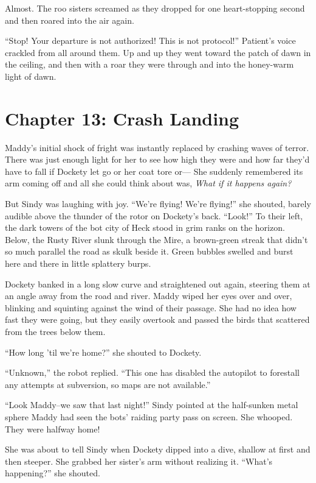 \documentclass[10pt]{article}
\begin{document}
Almost. The roo sisters screamed as they dropped for one heart-stopping
second and then roared into the air again.

``Stop! Your departure is not authorized! This is not protocol!''
Patient's voice crackled from all around them. Up and up they went
toward the patch of dawn in the ceiling, and then with a roar they were
through and into the honey-warm light of dawn.

\newpage
\section{Chapter 13: Crash Landing}

Maddy's initial shock of fright was instantly replaced by crashing waves
of terror. There was just enough light for her to see how high they were
and how far they'd have to fall if Dockety let go or her coat tore or---
She suddenly remembered its arm coming off and all she could think about
was, \emph{What if it happens again?}

But Sindy was laughing with joy. ``We're flying! We're flying!'' she
shouted, barely audible above the thunder of the rotor on Dockety's
back. ``Look!'' To their left, the dark towers of the bot city of Heck
stood in grim ranks on the horizon. Below, the Rusty River slunk through
the Mire, a brown-green streak that didn't so much parallel the road as
skulk beside it. Green bubbles swelled and burst here and there in
little splattery burps.

Dockety banked in a long slow curve and straightened out again, steering
them at an angle away from the road and river. Maddy wiped her eyes over
and over, blinking and squinting against the wind of their passage. She
had no idea how fast they were going, but they easily overtook and
passed the birds that scattered from the trees below them.

``How long 'til we're home?'' she shouted to Dockety.

``Unknown,'' the robot replied. ``This one has disabled the autopilot to
forestall any attempts at subversion, so maps are not available.''

``Look Maddy--we saw that last night!'' Sindy pointed at the half-sunken
metal sphere Maddy had seen the bots' raiding party pass on screen. She
whooped. They were halfway home!

She was about to tell Sindy when Dockety dipped into a dive, shallow at
first and then steeper. She grabbed her sister's arm without realizing
it. ``What's happening?'' she shouted.
\end{document}
